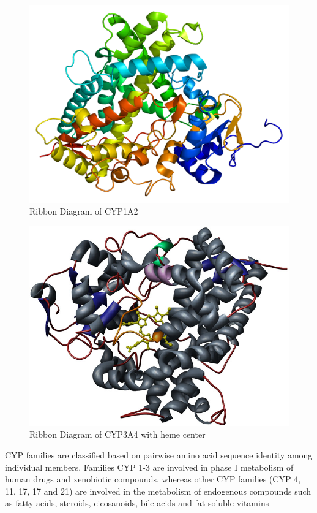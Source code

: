 \begin{figure}[H]
  \caption{Ribbon Diagram of CYP1A2}
  \centering
   \includegraphics[width=1\textwidth]{../img/CYP1A2_PDB.png}
\end{figure}

\begin{figure}[h,t]
  \caption{Ribbon Diagram of CYP3A4 with heme center}
  \centering
   \includegraphics[width=1\textwidth]{../img/CYP3A4_heme.jpg}
\end{figure}


CYP families are classified based on pairwise amino acid sequence identity among individual members. Families CYP 1-3 are involved in phase I metabolism of human drugs and xenobiotic compounds, whereas other CYP families (CYP 4, 11, 17, 17 and 21) are involved in the metabolism of endogenous compounds such as fatty acids, steroids, eicosanoids, bile acids and fat soluble vitamins\cite{Singh2011}

